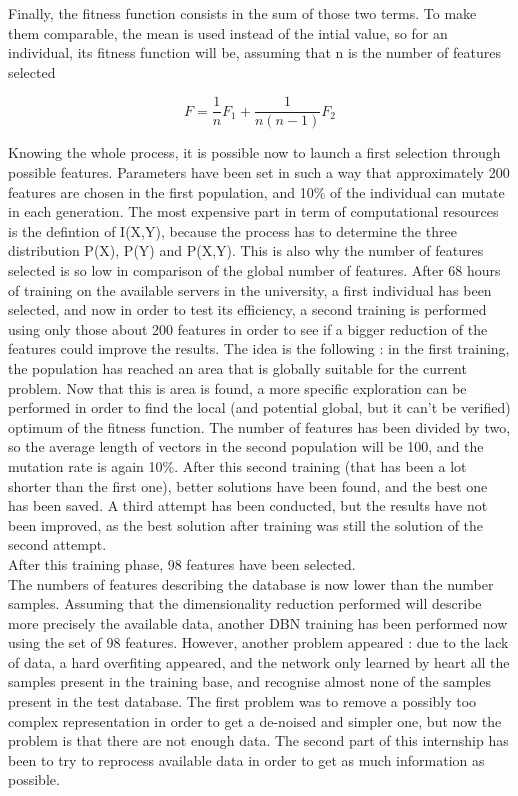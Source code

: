 \documentclass{report}
\begin{document}
	Finally, the fitness function consists in the sum of those two terms. To make them comparable, the mean is used instead of the intial value, so for an individual, its fitness function will be, assuming that n is the number of features selected
	
	\vspace{0.3cm}
	\begin{equation}
	F = \frac{1}{n}F_1 + \frac{1}{n(n-1)}F_2
	\end{equation}
	\vspace{0.3cm}
	
	Knowing the whole process, it is possible now to launch a first selection through possible features. Parameters have been set in such a way that approximately 200 features are chosen in the first population, and 10\% of the individual can mutate in each generation. The most expensive part in term of computational resources is the defintion of I(X,Y), because the process has to determine the three distribution P(X), P(Y) and P(X,Y). This is also why the number of features selected is so low in comparison of the global number of features. After 68 hours of training on the available servers in the university, a first individual has been selected, and now in order to test its efficiency, a second training is performed using only those about 200 features in order to see if a bigger reduction of the features could improve the results. The idea is the following : in the first training, the population has reached an area that is globally suitable for the current problem. Now that this is area is found, a more specific exploration can be performed in order to find the local (and potential global, but it can't be verified) optimum of the fitness function. The number of features has been divided by two, so the average length of vectors in the second population will be 100, and the mutation rate is again 10\%. After this second training (that has been a lot shorter than the first one), better solutions have been found, and the best one has been saved. A third attempt has been conducted, but the results have not been improved, as the best solution after training was still the solution of the second attempt.\\
	
	After this training phase, 98 features have been selected.\\
	
	The numbers of features describing the database is now lower than the number samples. Assuming that the dimensionality reduction performed will describe more precisely the available data, another DBN training has been performed now using the set of 98 features. However, another problem appeared : due to the lack of data, a hard overfiting appeared, and the network only learned by heart all the samples present in the training base, and recognise almost none of the samples present in the test database. The first problem was to remove a possibly too complex representation in order to get a de-noised and simpler one, but now the problem is that there are not enough data. The second part of this internship has been to try to reprocess available data in order to get as much information as possible.
	
\end{document}
